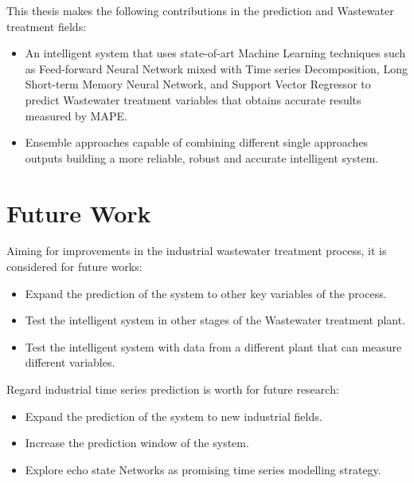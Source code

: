 This thesis makes the following contributions in the prediction and Wastewater  treatment fields:
\begin{itemize}
    \item An intelligent system that uses state-of-art Machine Learning techniques such as Feed-forward Neural Network mixed with Time series Decomposition, Long Short-term Memory Neural Network, and Support Vector Regressor to predict Wastewater treatment variables that obtains accurate results measured by MAPE.
    \item Ensemble approaches capable of combining different single approaches outputs building a more reliable, robust and accurate intelligent system.  
\end{itemize}
 

\section{Future Work}
Aiming for improvements in the industrial wastewater treatment process, it is considered for future works:
\begin{itemize}
    \item Expand the prediction of the system to other key variables of the process.
    \item Test the intelligent system in other stages of the Wastewater treatment plant.
    \item Test the intelligent system with data from a different plant that can measure different variables.
\end{itemize}
Regard industrial time series prediction is worth for future research:
\begin{itemize}
    \item Expand the prediction of the system to new industrial fields.
    \item Increase the prediction window of the system.
    \item Explore echo state Networks as promising time series modelling strategy.
\end{itemize}

